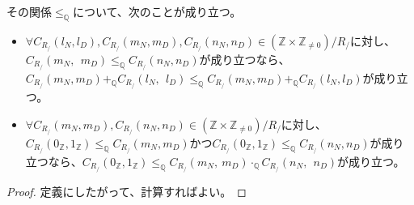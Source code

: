 \documentclass[dvipdfmx]{jsarticle}
\begin{document}
\begin{thm}\label{1.2.6.18}
その関係$\leq_{\mathbb{Q}}$について、次のことが成り立つ。
\begin{itemize}
\item
  $\forall C_{R_{/}}\left( l_{N},l_{D} \right),C_{R_{/}}\left( m_{N},m_{D} \right),C_{R_{/}}\left( n_{N},n_{D} \right) \in \left( \mathbb{Z} \times \mathbb{Z}_{\neq 0} \right) /R_{/} $に対し、$C_{R_{/}}\left( m_{N},\ \ m_{D} \right) \leq_{\mathbb{Q}}C_{R_{/}}\left( n_{N},n_{D} \right)$が成り立つなら、$C_{R_{/}}\left( m_{N},m_{D} \right) +_{\mathbb{Q}}C_{R_{/}}\left( l_{N},\ \ l_{D} \right) \leq_{\mathbb{Q}}C_{R_{/}}\left( m_{N},m_{D} \right) +_{\mathbb{Q}}C_{R_{/}}\left( l_{N},l_{D} \right)$が成り立つ。
\item
  $\forall C_{R_{/}}\left( m_{N},m_{D} \right),C_{R_{/}}\left( n_{N},n_{D} \right) \in \left( \mathbb{Z} \times \mathbb{Z}_{\neq 0} \right) /R_{/} $に対し、$C_{R_{/}}\left( 0_{\mathbb{Z}},1_{\mathbb{Z}} \right) \leq_{\mathbb{Q}}C_{R_{/}}\left( m_{N},m_{D} \right)$かつ$C_{R_{/}}\left( 0_{\mathbb{Z}},1_{\mathbb{Z}} \right) \leq_{\mathbb{Q}}C_{R_{/}}\left( n_{N},n_{D} \right)$が成り立つなら、$C_{R_{/}}\left( 0_{\mathbb{Z}},1_{\mathbb{Z}} \right) \leq_{\mathbb{Q}}C_{R_{/}}\left( m_{N},\ m_{D} \right) \cdot_{\mathbb{Q}}C_{R_{/}}\left( n_{N},\ \ n_{D} \right)$が成り立つ。
\end{itemize}
\end{thm}
\begin{proof}
定義にしたがって、計算すればよい。
\end{proof}
\end{document}
